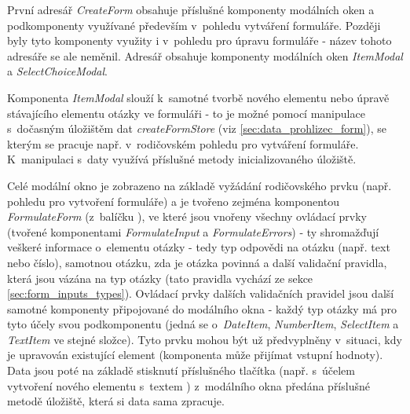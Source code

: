 			První adresář \textit{CreateForm} obsahuje příslušné komponenty modálních oken a podkomponenty využívané především v~pohledu vytváření formuláře. Později byly tyto komponenty využity i v~pohledu pro úpravu formuláře - název tohoto adresáře se ale neměnil. Adresář obsahuje komponenty modálních oken \textit{ItemModal} a \textit{SelectChoiceModal}.
			
			Komponenta \textit{ItemModal} slouží k~samotné tvorbě nového elementu nebo úpravě stávajícího elementu otázky ve formuláři - to je možné pomocí manipulace s~dočasným úložištěm dat \textit{createFormStore} (viz \ref{sec:data_prohlizec_form}), se kterým se pracuje např. v~rodičovském pohledu pro vytváření formuláře. K~manipulaci s~daty využívá příslušné metody inicializovaného úložiště.
			
			Celé modální okno je zobrazeno na základě vyžádání rodičovského prvku (např. pohledu pro vytvoření formuláře) a je tvořeno zejména komponentou \textit{FormulateForm} (z~balíčku ), ve které jsou vnořeny všechny ovládací prvky (tvořené komponentami \textit{FormulateInput} a \textit{FormulateErrors}) - ty shromažďují veškeré informace o~elementu otázky - tedy typ odpovědi na otázku (např. text nebo číslo), samotnou otázku, zda je otázka povinná a další validační pravidla, která jsou vázána na typ otázky (tato pravidla vychází ze sekce \ref{sec:form_inputs_types}). Ovládací prvky dalších validačních pravidel jsou další samotné komponenty připojované do modálního okna - každý typ otázky má pro tyto účely svou podkomponentu (jedná se o~\textit{DateItem}, \textit{NumberItem}, \textit{SelectItem} a \textit{TextItem} ve stejné složce). Tyto prvku mohou být už předvyplněny v~situaci, kdy je upravován existující element (komponenta může přijímat vstupní hodnoty). Data jsou poté na základě stisknutí příslušného tlačítka (např. s~účelem vytvoření nového elementu s~textem ) z~modálního okna předána příslušné metodě úložiště, která si data sama zpracuje.
			
